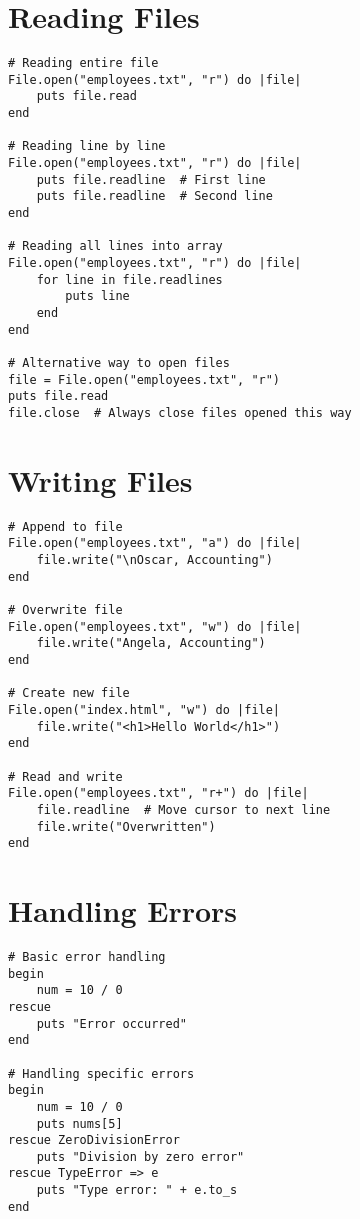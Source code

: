 \documentclass[12pt,a4paper]{article}
\begin{document}
\section{Reading Files}

\begin{lstlisting}
# Reading entire file
File.open("employees.txt", "r") do |file|
    puts file.read
end

# Reading line by line
File.open("employees.txt", "r") do |file|
    puts file.readline  # First line
    puts file.readline  # Second line
end

# Reading all lines into array
File.open("employees.txt", "r") do |file|
    for line in file.readlines
        puts line
    end
end

# Alternative way to open files
file = File.open("employees.txt", "r")
puts file.read
file.close  # Always close files opened this way
\end{lstlisting}

\section{Writing Files}

\begin{lstlisting}
# Append to file
File.open("employees.txt", "a") do |file|
    file.write("\nOscar, Accounting")
end

# Overwrite file
File.open("employees.txt", "w") do |file|
    file.write("Angela, Accounting")
end

# Create new file
File.open("index.html", "w") do |file|
    file.write("<h1>Hello World</h1>")
end

# Read and write
File.open("employees.txt", "r+") do |file|
    file.readline  # Move cursor to next line
    file.write("Overwritten")
end
\end{lstlisting}

\section{Handling Errors}

\begin{lstlisting}
# Basic error handling
begin
    num = 10 / 0
rescue
    puts "Error occurred"
end

# Handling specific errors
begin
    num = 10 / 0
    puts nums[5]
rescue ZeroDivisionError
    puts "Division by zero error"
rescue TypeError => e
    puts "Type error: " + e.to_s
end
\end{lstlisting}
\end{document}
